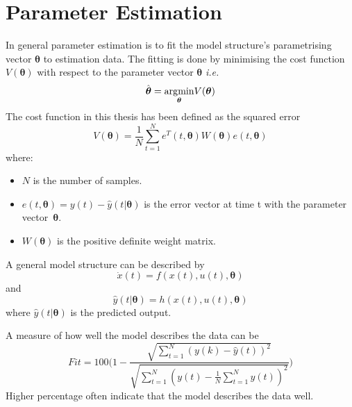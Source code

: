 \section{Parameter Estimation} 
In general parameter estimation is to fit the model structure's parametrising vector $\boldsymbol{\theta}$ to estimation data. The fitting is done by minimising the cost function $V(\boldsymbol{\theta})$ with respect to the parameter vector $\boldsymbol{\theta}$ \emph{i.e.}
\begin{equation}
\hat{\boldsymbol{\theta}} = \underset{\boldsymbol{\theta}}{\operatorname*{\arg\!\min}} V(\boldsymbol{\theta})
\end{equation}
The cost function in this thesis has been defined as the squared error
\begin{equation}
    V(\boldsymbol{\theta}) = \frac{1}{N} \sum_{t=1}^{N} e^T(t,\boldsymbol{\theta}) W(\boldsymbol{\theta})  e(t,\boldsymbol{\theta})
\end{equation}
where:
\begin{itemize}
    \item $N$ is the number of samples.
    \item $e(t,\boldsymbol{\theta}) = y(t) - \hat{y}(t|\boldsymbol{\theta})$ is the error vector at time t with the parameter vector~$\boldsymbol{\theta}$.
    \item $W(\boldsymbol{\theta})$ is the positive definite weight matrix.
\end{itemize}

A general model structure can be described by
\begin{equation}
\dot{x}(t) = f(x(t), u(t), \boldsymbol{\theta})
\end{equation}
and
\begin{equation}
\hat{y}(t|\boldsymbol{\theta}) = h(x(t), u(t), \boldsymbol{\theta})
\end{equation}
 where $\hat{y}(t|\boldsymbol{\theta})$ is the predicted output. 
 
A measure of how well the model describes the data can be
\begin{equation}
Fit = 100 \Biggr(1 - \frac{\sqrt{\sum\limits_{t=1}^N (y(k) - \hat{y}(t))^2}}{\sqrt{\sum\limits_{t=1}^N(y(t)-\frac{1}{N}\sum\limits_{t=1}^N y(t))^2}}\Biggl)
\end{equation} 
Higher percentage often indicate that the model describes the data well. 
